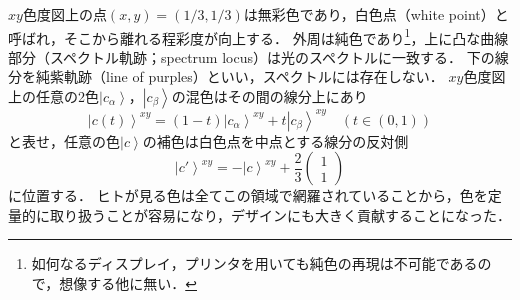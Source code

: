 \documentclass[uplatex,paper=a4,fontsize=4.0truemm,jafontsize=4.0truemm,head_space=30.0truemm,foot_space=30.0truemm,baselineskip=8.0truemm,line_length=40zw,gutter=25.0truemm,oneside,openany,fleqn,hanging_panctuation,open_bracket_pos=nibu_tentsuki,dvipdfmx,jis2004,book,titlepage]{jlreq}
\theoremstyle{mystyle}
\newcommand{\mathdisplaystyle}[1]{\(\displaystyle{#1}\)}
\newcommand{\negativevalue}[1]{{-#1}}
\newcommand{\fraction}[2]{\displaystyle{\frac{\displaystyle{#1}}{\displaystyle{#2}}}}
\newcommand{\parentheses}[1]{\left(#1\right)}
\newcommand{\Diracket}[1]{\left\lvert#1\right\rangle}
\newcommand{\easymatrix}[1]{\mathord{\begin{pmatrix}#1\end{pmatrix}}}
\begin{document}
			\mathdisplaystyle{xy}色度図上の点\mathdisplaystyle{\parentheses{x,y}=\parentheses{1/3,1/3}}は無彩色であり，白色点（white point）と呼ばれ，そこから離れる程彩度が向上する．
			外周は純色であり\footnote{如何なるディスプレイ，プリンタを用いても純色の再現は不可能であるので，想像する他に無い．}，上に凸な曲線部分（スペクトル軌跡；spectrum locus）は光のスペクトルに一致する．
			下の線分を純紫軌跡（line of purples）といい，スペクトルには存在しない．
			\mathdisplaystyle{xy}色度図上の任意の2色\mathdisplaystyle{\Diracket{c_\alpha}}，\mathdisplaystyle{\Diracket{c_\beta}}の混色はその間の線分上にあり
			\begin{equation*}
				\Diracket{c\parentheses{t}}^{xy}=\parentheses{1-t}\Diracket{c_\alpha}^{xy}+t\Diracket{c_\beta}^{xy}\quad\parentheses{t\in\parentheses{0,1}}
			\end{equation*}
			と表せ，任意の色\mathdisplaystyle{\Diracket{c}}の補色は白色点を中点とする線分の反対側
			\begin{equation*}
				\Diracket{c'}^{xy}=\negativevalue{\Diracket{c}^{xy}}+\fraction{2}{3}\easymatrix{1 \\ 1}
			\end{equation*}
			に位置する．
			ヒトが見る色は全てこの領域で網羅されていることから，色を定量的に取り扱うことが容易になり，デザインにも大きく貢献することになった．
\end{document}
